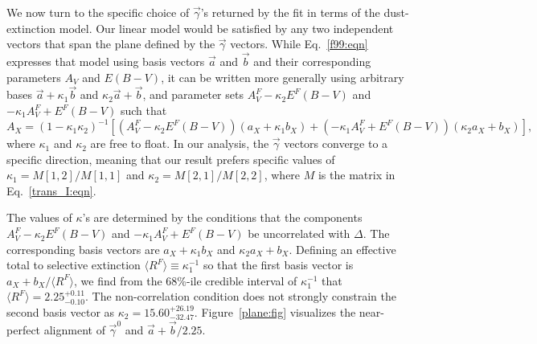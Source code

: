 \documentclass[trackchanges]{aastex62}   	%
\begin{document}
We
now turn to
the specific choice of $\vec{\gamma}$'s  returned by the fit in terms of the   dust-extinction model. 
Our linear model would be satisfied by any two independent vectors  that span
the plane defined by the $\vec{\gamma}$ vectors. 
While
Eq.~\ref{f99:eqn} expresses that model using basis vectors $\vec{a}$ and $\vec{b}$ and
their corresponding parameters 
$A_V$ and 
$E(B-V)$, it can be written more generally using arbitrary bases $\vec{a}+\kappa_1 \vec{b}$
and $\kappa_2 \vec{a} + \vec{b}$, and parameter sets
$A^F_V - \kappa_2 E^F(B-V)$ and $-\kappa_1 A^F_V + E^F(B-V)$  such that 
\begin{equation}
A_X =  (1-\kappa_1 \kappa_2)^{-1} [(A^F_V - \kappa_2 E^F(B-V))\left(a_X+\kappa_1 b_X \right) +  (-\kappa_1 A^F_V + E^F(B-V)) (\kappa_2 a_X + b_X)],
\label{newdust:eqn}
\end{equation}
where $\kappa_1$ and $\kappa_2$ are free to float.
In our analysis, the $\vec{\gamma}$ vectors converge to a specific direction, meaning that our result prefers specific values of
$\kappa_1=M[1,2]/M[1,1]$ and $\kappa_2=M[2,1]/M[2,2]$, where $M$ is the matrix in  Eq.~\ref{trans_I:eqn}.

The values of $\kappa$'s are determined by the conditions that the components $A^F_V - \kappa_2 E^F(B-V)$ and $-\kappa_1 A^F_V + E^F(B-V)$ be
uncorrelated with $\Delta$.   The corresponding basis vectors are $a_X+\kappa_1 b_X $ and $\kappa_2 a_X + b_X$.
Defining an effective total to selective extinction $\langle R^F \rangle \equiv \kappa_1^{-1}$ so that the first basis vector is
$a_X+ b_X/\langle R^F \rangle  $, we find from the 68\%-ile credible interval of $\kappa_1^{-1}$ that
$\langle R^F \rangle=2.25^{+0.11}_{-0.10}$.
The non-correlation condition does not strongly constrain the  second basis vector as
$\kappa_2 =  15.60^{+26.19}_{-32.47}$.
Figure~\ref{plane:fig} visualizes the near-perfect alignment of $\vec{\gamma}^0$ and  $\vec{a}+\vec{b}/2.25$.
\end{document}
